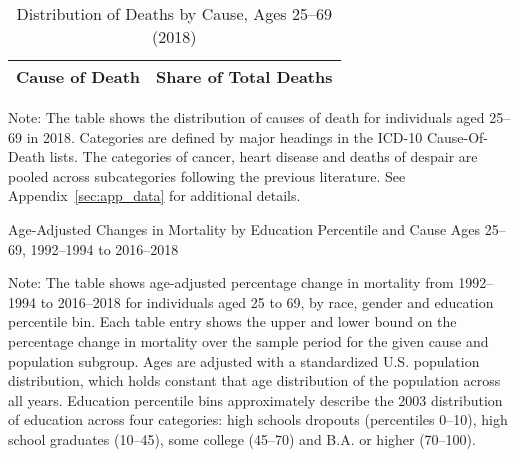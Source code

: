 \begin{table}[H]
  \caption{Distribution of Deaths by Cause, Ages 25--69 (2018)}
  \label{tab:icd_causes}
  \begin{tabular}{lc}
    Cause of Death & Share of Total Deaths \\
    \hline
    
    \hline
  \end{tabular}
  \footnotesize{Note: The table shows the distribution of causes of
    death for individuals aged 25--69 in 2018. Categories are defined
    by major headings in the ICD-10 Cause-Of-Death lists. The
    categories of cancer, heart disease and deaths of despair are
    pooled across subcategories following the previous literature. See
    Appendix~\ref{sec:app_data} for additional details.}
\end{table}

\begin{landscape}
  \begin{table}[htbp]
    \caption{Age-Adjusted Changes in Mortality by
      Education Percentile and Cause \cnewline Ages 25--69, 1992--1994
      to 2016--2018}
    \label{tab:all_cause_all_age}
    
  \end{table}
  \footnotesize{ Note: The table shows age-adjusted percentage change
    in mortality from 1992--1994 to 2016--2018 for individuals aged 25
    to 69, by race, gender and education percentile bin. Each table
    entry shows the upper and lower bound on the percentage change in
    mortality over the sample period for the given cause and
    population subgroup. Ages are adjusted with a standardized
    U.S. population distribution, which holds constant that age
    distribution of the population across all years. Education
    percentile bins approximately describe the 2003 distribution of
    education across four categories: high schools dropouts
    (percentiles 0--10), high school graduates (10--45), some college
    (45--70) and B.A. or higher (70--100).}
\end{landscape}

